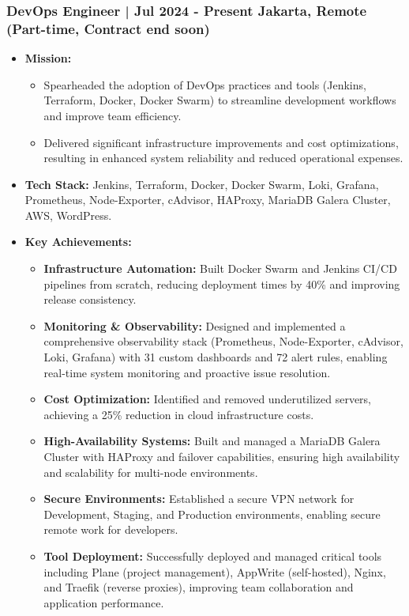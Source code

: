 \documentclass[11pt]{article}
\begin{document}
\subsubsection{DevOps Engineer | Jul 2024 - Present \hfill Jakarta, Remote (Part-time, Contract end soon)}
\begin{itemize}
    \item \textbf{Mission:} 
    \begin{itemize}
        \item Spearheaded the adoption of DevOps practices and tools (Jenkins, Terraform, Docker, Docker Swarm) to streamline development workflows and improve team efficiency.
        \item Delivered significant infrastructure improvements and cost optimizations, resulting in enhanced system reliability and reduced operational expenses.
    \end{itemize}
    \item \textbf{Tech Stack:} Jenkins, Terraform, Docker, Docker Swarm, Loki, Grafana, Prometheus, Node-Exporter, cAdvisor, HAProxy, MariaDB Galera Cluster, AWS, WordPress.
    \item \textbf{Key Achievements:}
    \begin{itemize}
        \item \textbf{Infrastructure Automation:} Built Docker Swarm and Jenkins CI/CD pipelines from scratch, reducing deployment times by 40\% and improving release consistency.
        \item \textbf{Monitoring \& Observability:} Designed and implemented a comprehensive observability stack (Prometheus, Node-Exporter, cAdvisor, Loki, Grafana) with 31 custom dashboards and 72 alert rules, enabling real-time system monitoring and proactive issue resolution.
        \item \textbf{Cost Optimization:} Identified and removed underutilized servers, achieving a 25\% reduction in cloud infrastructure costs.
        \item \textbf{High-Availability Systems:} Built and managed a MariaDB Galera Cluster with HAProxy and failover capabilities, ensuring high availability and scalability for multi-node environments.
        \item \textbf{Secure Environments:} Established a secure VPN network for Development, Staging, and Production environments, enabling secure remote work for developers.
        \item \textbf{Tool Deployment:} Successfully deployed and managed critical tools including Plane (project management), AppWrite (self-hosted), Nginx, and Traefik (reverse proxies), improving team collaboration and application performance.

\end{itemize}
\end{itemize}
\end{document}
